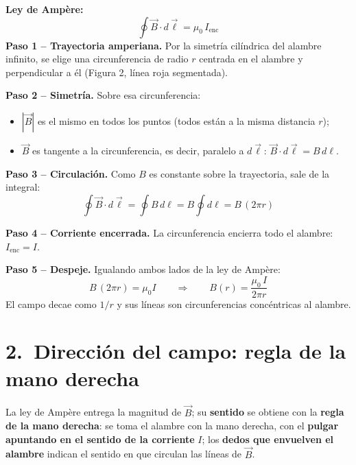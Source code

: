 \documentclass[12pt,letterpaper]{article}
\begin{document}
\begin{minipage}[t]{0.56\textwidth}
\vspace{0pt}
\textbf{Ley de Amp\`ere:}
\[
    \oint \vec{B}\cdot d\vec{\ell} = \mu_0\, I_{\text{enc}}
\]
\textbf{Paso 1 -- Trayectoria amperiana.} Por la simetr\'ia cil\'indrica del alambre infinito,
se elige una circunferencia de radio $r$ centrada en el alambre y perpendicular a \'el
(Figura 2, l\'inea roja segmentada).

\smallskip
\textbf{Paso 2 -- Simetr\'ia.} Sobre esa circunferencia:
\begin{itemize}\setlength\itemsep{1pt}
    \item $|\vec{B}|$ es el mismo en todos los puntos (todos est\'an a la misma distancia $r$);
    \item $\vec{B}$ es tangente a la circunferencia, es decir, paralelo a $d\vec{\ell}$:
          $\vec{B}\cdot d\vec{\ell} = B\,d\ell$.
\end{itemize}
\end{minipage}

\medskip

\noindent\textbf{Paso 3 -- Circulaci\'on.} Como $B$ es constante sobre la trayectoria, sale de la
integral:
\[
    \oint \vec{B}\cdot d\vec{\ell} = \oint B\,d\ell = B\oint d\ell = B\,(2\pi r)
\]

\noindent\textbf{Paso 4 -- Corriente encerrada.} La circunferencia encierra todo el alambre:
$I_{\text{enc}} = I$.

\medskip
\noindent\textbf{Paso 5 -- Despeje.} Igualando ambos lados de la ley de Amp\`ere:
\[
    B\,(2\pi r) = \mu_0 I
    \qquad\Longrightarrow\qquad
    \boxed{B(r) = \frac{\mu_0\, I}{2\pi r}}
\]
El campo decae como $1/r$ y sus l\'ineas son circunferencias conc\'entricas al alambre.

\section*{2.\ Direcci\'on del campo: regla de la mano derecha}

\noindent La ley de Amp\`ere entrega la magnitud de $\vec{B}$; su \textbf{sentido} se obtiene con la
\textbf{regla de la mano derecha}: se toma el alambre con la mano derecha, con el
\textbf{pulgar apuntando en el sentido de la corriente} $I$; los \textbf{dedos que envuelven el
alambre} indican el sentido en que circulan las l\'ineas de $\vec{B}$.
\end{document}
